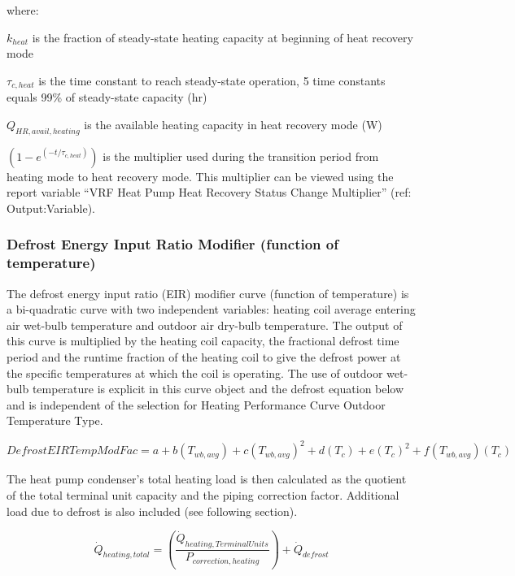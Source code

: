 where:

\(k_{heat}\) is the fraction of steady-state heating capacity at beginning of heat recovery mode

\(\tau_{c,heat}\) is the time constant to reach steady-state operation, 5 time constants equals 99\% of steady-state capacity (hr)

\(Q_{HR,avail,heating}\) is the available heating capacity in heat recovery mode (W)

\(\left( 1 - e^{\left( -t / \tau_{c,heat} \right)} \right)\) is the multiplier used during the transition period from heating mode to heat recovery mode. This multiplier can be viewed using the report variable ``VRF Heat Pump Heat Recovery Status Change Multiplier'' (ref: Output:Variable).

\subsubsection{Defrost Energy Input Ratio Modifier (function of temperature)}\label{defrost-energy-input-ratio-modifier-function-of-temperature}

The defrost energy input ratio (EIR) modifier curve (function of temperature) is a bi-quadratic curve with two independent variables: heating coil average entering air wet-bulb temperature and outdoor air dry-bulb temperature. The output of this curve is multiplied by the heating coil capacity, the fractional defrost time period and the runtime fraction of the heating coil to give the defrost power at the specific temperatures at which the coil is operating. The use of outdoor wet-bulb temperature is explicit in this curve object and the defrost equation below and is independent of the selection for Heating Performance Curve Outdoor Temperature Type.

\begin{equation}
  DefrostEIRTempModFac = a + b\left( {{T_{wb,avg}}} \right) + c{\left( {{T_{wb,avg}}} \right)^2} + d\left( {{T_c}} \right) + e{\left( {{T_c}} \right)^2} + f\left( {{T_{wb,avg}}} \right)\left( {{T_c}} \right)
\end{equation}

The heat pump condenser's total heating load is then calculated as the quotient of the total terminal unit capacity and the piping correction factor. Additional load due to defrost is also included (see following section).

\begin{equation}
  \dot{Q}_{heating,total} = \left( \frac{\dot{Q}_{heating,TerminalUnits}}{P_{correction,heating}} \right) + \dot{Q}_{defrost}
\end{equation}

